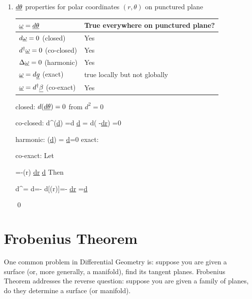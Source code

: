 \begin{enumerate}
\beq
\oint_{r=R}d\theta = 2\pi
\eeq

\item $\ul{d\theta}$ properties for 
polar coordinates $(r,\theta)$ on punctured plane

\begin{claim}
\begin{center}
\begin{tabular}{|l|l|}
\hline
\rowcolor[HTML]{FFFE65} 
$\ul{\omega}=\ul{d\theta}$ & True everywhere on punctured plane? \\ \hline
$d\ul{\omega}=0$ (closed) & Yes \\ \hline
$d^\dag\ul{\omega}=0$ (co-closed) & Yes \\ \hline
$\Delta\ul{\omega}=0$ (harmonic) & Yes \\ \hline
$\ul{\omega}=d\ul{g}$ (exact) & true locally but not globally \\ \hline
$\ul{\omega}=d^\dag\ul{\beta}$ (co-exact)& Yes \\ \hline
\end{tabular}
\end{center}
\end{claim}
\proof

closed: $d(\ul{d\theta})=0$ from $d^2=0$

co-closed:
\beq
d^\dagger (\ul{d\theta})
=\star d \star \ul{d\theta}
=
\star d\left(
-\ul{dr}\right)
=0
\eeq

harmonic:
\beq
\Delta(\ul{d\theta}) = \ul{d\theta}=0
\eeq
exact: 

co-exact:
Let 

\beq
\ul{\beta}=-\ln(r)
\ul{dr}\wedge
\ul{d\theta}
\eeq
Then

\beq
d^\dag\ul{\beta}=
\star d=-
\star d[\ln(r)]=-
\star {}
\ul{dr}
=\ul{d\theta}
\eeq


\qed

\end{enumerate}




\section{Frobenius Theorem}\label{sec-Frob-theorem}

One common problem 
in Differential Geometry is: suppose you are given a surface (or, more generally, a manifold),
find its tangent planes. Frobenius Theorem addresses the reverse question:
suppose you are given a 
family of planes, do they 
determine a surface (or manifold). 


